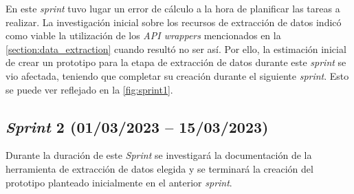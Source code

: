 En este \textit{sprint} tuvo lugar un error de cálculo a la hora de planificar las tareas a realizar. La investigación inicial sobre los recursos de extracción de datos indicó como viable la utilización de los \textit{API wrappers} mencionados en la \autoref{section:data_extraction} cuando resultó no ser así. Por ello, la estimación inicial de crear un prototipo para la etapa de extracción de datos durante este \textit{sprint} se vio afectada, teniendo que completar su creación durante el siguiente \textit{sprint}. Esto se puede ver reflejado en la \autoref{fig:sprint1}.

\subsection{\textit{Sprint} 2 (01/03/2023 -- 15/03/2023)}

Durante la duración de este \textit{Sprint} se investigará la documentación de la herramienta de extracción de datos elegida y se terminará la creación del prototipo planteado inicialmente en el anterior \textit{sprint}.

